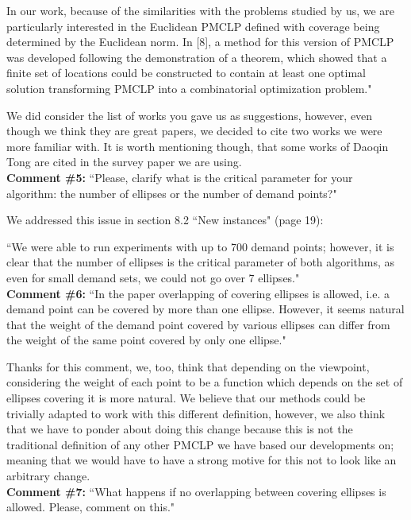 	In our work, because of the similarities with the problems studied by us, we are particularly interested in the Euclidean PMCLP defined with coverage being determined by the Euclidean norm.	In [8], a method for this version of PMCLP was developed following the demonstration of a theorem,	which showed that a finite set of locations could be constructed to contain at least one optimal	solution transforming PMCLP into a combinatorial optimization problem."
	
	We did consider the list of works you gave us as suggestions, however, even though we think they are great papers, we decided to cite two works we were more familiar with. It is worth mentioning though, that some works of Daoqin Tong are cited in the survey paper we are using.
\\
	
		\textbf{Comment \#5:} ``Please, clarify what is the critical parameter for your algorithm: the number of ellipses or the number of demand points?"
		
		We addressed this issue in section 8.2 ``New instances" (page 19):
		
		``We were able to run experiments with up to 700 demand points; however, it is clear that the number of ellipses is the critical parameter of both algorithms, as even for small demand sets, we could not go over 7 ellipses."
		\\
		
		\textbf{Comment \#6:} ``In the paper overlapping of covering ellipses is allowed, i.e. a demand point can be covered by more than one ellipse. However, it seems natural that the weight of the demand point covered by various ellipses can differ from the weight of the same point covered by only one ellipse."
		
		Thanks for this comment, we, too, think that depending on the viewpoint, considering the weight of each point to be a function which depends on the set of ellipses covering it is more natural. We believe that our methods could be trivially adapted to work with this different definition, however, we also think that we have to ponder about doing this change because this is not the traditional definition of any other PMCLP we have based our developments on; meaning that we would have to have a strong motive for this not to look like an arbitrary change.
		\\	
		
		\textbf{Comment \#7:} ``What happens if no overlapping between covering ellipses is allowed. Please, comment on this."
		
